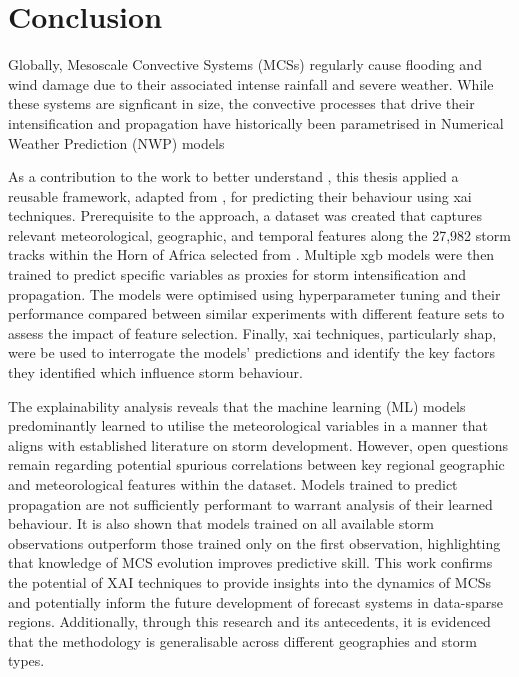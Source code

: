 \chapter{Conclusion}
\label{ch:con}

Globally, Mesoscale Convective Systems (MCSs) regularly cause flooding and wind damage due to their associated intense rainfall and severe weather. While these systems are signficant in size, the convective processes that drive their intensification and propagation have historically been parametrised in Numerical Weather Prediction (NWP) models

As a contribution to the work to better understand , this thesis applied a reusable framework, adapted from \cite{Hunt2024}, for predicting their behaviour using \acrfull{xai} techniques. Prerequisite to the approach, a dataset was created that captures relevant meteorological, geographic, and temporal features along the 27,982 storm tracks within the Horn of Africa selected from \cite{Hill2023}. Multiple \acrfull{xgb} models were then trained to predict specific variables as proxies for storm intensification and propagation. The models were optimised using hyperparameter tuning and their performance compared between similar experiments with different feature sets to assess the impact of feature selection. Finally, \acrshort{xai} techniques, particularly \acrshort{shap}, were be used to interrogate the models' predictions and identify the key factors they identified which influence storm behaviour.

The explainability analysis reveals that the machine learning (ML) models predominantly learned to utilise the meteorological variables in a manner that aligns with established literature on storm development. However, open questions remain regarding potential spurious correlations between key regional geographic and meteorological features within the dataset. Models trained to predict propagation are not sufficiently performant to warrant analysis of their learned behaviour. It is also shown that models trained on all available storm observations outperform those trained only on the first observation, highlighting that knowledge of MCS evolution improves predictive skill. This work confirms the potential of XAI techniques to provide insights into the dynamics of MCSs and potentially inform the future development of forecast systems in data-sparse regions. Additionally, through this research and its antecedents, it is evidenced that the methodology is generalisable across different geographies and storm types. 

